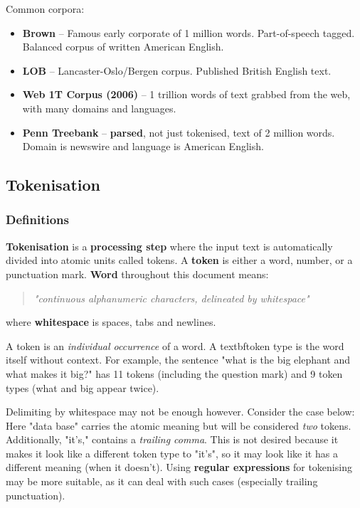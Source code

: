 \documentclass{article}
\begin{document}
Common corpora:
\begin{itemize}
	\item \textbf{Brown} -- Famous early corporate of 1 million words. Part-of-speech tagged. Balanced corpus of written American English.
	\item \textbf{LOB} -- Lancaster-Oslo/Bergen corpus. Published British English text.
	\item \textbf{Web 1T Corpus (2006)} -- 1 trillion words of text grabbed from the web, with many domains and languages.
	\item \textbf{Penn Treebank} -- \textbf{parsed}, not just tokenised, text of 2 million words. Domain is newswire and language is American English.
\end{itemize}

\subsection{Tokenisation}

\subsubsection{Definitions}

\textbf{Tokenisation} is a \textbf{processing step} where the input text is automatically divided into atomic units called tokens. A \textbf{token} is either a word, number, or a punctuation mark. \textbf{Word} throughout this document means:
\begin{quote}
	\textit{"continuous alphanumeric characters, delineated by whitespace"}
\end{quote}
where \textbf{whitespace} is spaces, tabs and newlines.

A token is an \textit{individual occurrence} of a word. A textbf{token type} is the word itself without context. For example, the sentence "what is the big elephant and what makes it big?" has 11 tokens (including the question mark) and 9 token types (what and big appear twice).

Delimiting by whitespace may not be enough however. Consider the case below:
Here "data base" carries the atomic meaning but will be considered \textit{two} tokens. Additionally, "it's," contains a \textit{trailing comma}. This is not desired because it makes it look like a different token type to "it's", so it may look like it has a different meaning (when it doesn't). Using \textbf{regular expressions} for tokenising may be more suitable, as it can deal with such cases (especially trailing punctuation).
\end{document}
